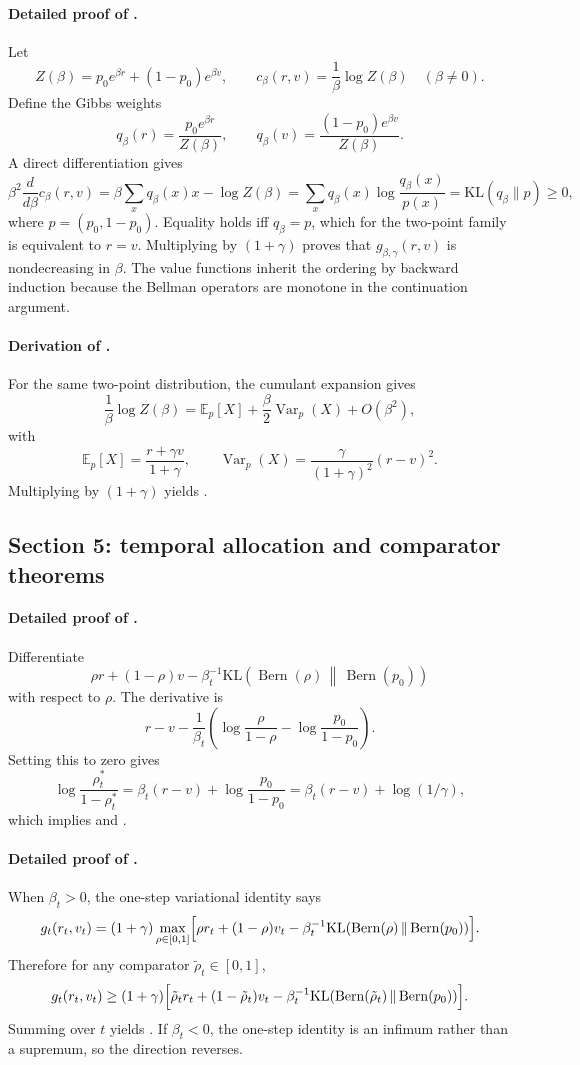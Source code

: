 \documentclass{article}
\theoremstyle{remark}
\DeclareMathOperator{\Bern}{Bern}
\DeclareMathOperator{\Var}{Var}
\newcommand{\E}{\mathbb{E}}
\newcommand{\KL}{\mathrm{KL}}
\newcommand{\pprior}{p_0}
\newcommand{\KLbin}[2]{\KL\!\left(\Bern(#1)\,\middle\|\,\Bern(#2)\right)}
\begin{document}
\paragraph{Detailed proof of .}
Let
\[
Z(\beta)=\pprior e^{\beta r}+(1-\pprior)e^{\beta v},
\qquad
c_\beta(r,v)=\frac{1}{\beta}\log Z(\beta)
\quad (\beta\neq 0).
\]
Define the Gibbs weights
\[
q_\beta(r)=\frac{\pprior e^{\beta r}}{Z(\beta)},
\qquad
q_\beta(v)=\frac{(1-\pprior)e^{\beta v}}{Z(\beta)}.
\]
A direct differentiation gives
\[
\beta^2\frac{d}{d\beta}c_\beta(r,v)
=\beta\sum_x q_\beta(x)x - \log Z(\beta)
=\sum_x q_\beta(x)\log\frac{q_\beta(x)}{p(x)}
=\KL(q_\beta\|p)\ge 0,
\]
where $p=(\pprior,1-\pprior)$.
Equality holds iff $q_\beta=p$, which for the two-point family is equivalent to $r=v$.
Multiplying by $(1+\gamma)$ proves that $g_{\beta,\gamma}(r,v)$ is nondecreasing in $\beta$.
The value functions inherit the ordering by backward induction because the Bellman operators are monotone in the continuation argument.

\paragraph{Derivation of .}
For the same two-point distribution, the cumulant expansion gives
\[
\frac{1}{\beta}\log Z(\beta)=\E_p[X]+\frac{\beta}{2}\Var_p(X)+O(\beta^2),
\]
with
\[
\E_p[X]=\frac{r+\gamma v}{1+\gamma},
\qquad
\Var_p(X)=\frac{\gamma}{(1+\gamma)^2}(r-v)^2.
\]
Multiplying by $(1+\gamma)$ yields .

\subsection{Section 5: temporal allocation and comparator theorems}
\label{app:temporal}

\paragraph{Detailed proof of .}
Differentiate
\[
\rho r +(1-\rho)v - \beta_t^{-1}\KLbin{\rho}{\pprior}
\]
with respect to $\rho$.
The derivative is
\[
r-v-\frac{1}{\beta_t}\left(\log\frac{\rho}{1-\rho}-\log\frac{\pprior}{1-\pprior}\right).
\]
Setting this to zero gives
\[
\log\frac{\rho_t^*}{1-\rho_t^*}=\beta_t(r-v)+\log\frac{\pprior}{1-\pprior}=\beta_t(r-v)+\log(1/\gamma),
\]
which implies  and .

\paragraph{Detailed proof of .}
When $\beta_t>0$, the one-step variational identity says
\[
g_t(r_t,v_t)=(1+\gamma)\max_{\rho\in[0,1]}\Bigl[\rho r_t+(1-\rho)v_t-\beta_t^{-1}\KLbin{\rho}{\pprior}\Bigr].
\]
Therefore for any comparator $\tilde\rho_t\in[0,1]$,
\[
g_t(r_t,v_t)\ge (1+\gamma)\Bigl[\tilde\rho_t r_t+(1-\tilde\rho_t)v_t-\beta_t^{-1}\KLbin{\tilde\rho_t}{\pprior}\Bigr].
\]
Summing over $t$ yields .
If $\beta_t<0$, the one-step identity is an infimum rather than a supremum, so the direction reverses.
\end{document}
